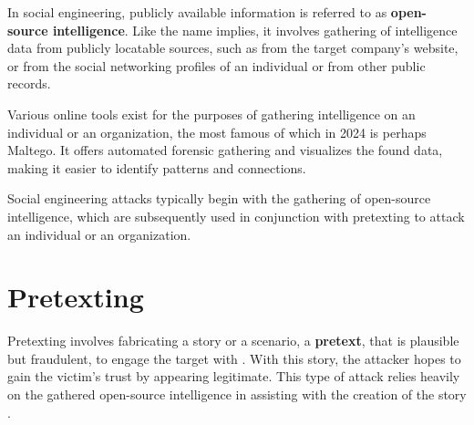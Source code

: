 In social engineering, publicly available information is referred to as \textbf{open-source intelligence}. Like the name implies, it involves gathering of intelligence data from publicly locatable sources, such as from the target company's website, or from the social networking profiles of an individual or from other public records.

Various online tools exist for the purposes of gathering intelligence on an individual or an organization, the most famous of which in 2024 is perhaps Maltego. It offers automated forensic gathering and visualizes the found data, making it easier to identify patterns and connections.

Social engineering attacks typically begin with the gathering of open-source intelligence, which are subsequently used in conjunction with pretexting to attack an individual or an organization.











\section{Pretexting}
\begin{comment}

    - General info about what is pretexting
    - Fabricated scenario that is plausible but fraudulent
    - Originally used by FBI
    - Impersonation
    - Discussion about how modern AI can aid with pretexting is in the final chapter
    - Role in the deception-based SE attacks
    - Common pretexting tactics will be covered later
    - How AI powers up pretexting will be discussed later
        - How AI tech can be utilized to create more sophisticated and convincing pretexts
        - Examples of successful pretexting attacks and their impacts
        - AI and automated pretexting attacks and their effectiveness
        - Analysis of pretexting evolving landscape with AI
    - Ethical considerations?
    - Countermeasures will be covered later also
        - How to identify and mitigate attempts
        - Recommendations for organiations to enhance their defenses against pretexting attacks
        
\end{comment}

Pretexting involves fabricating a story or a scenario, a \textbf{pretext}, that is plausible but fraudulent, to engage the target  with \citep{contehCybersecurityRisksVulnerabilities2016, fakhouriAIDrivenSolutionsForSocialEngineeringAttacks2024}. With this story, the attacker hopes to gain the victim's trust by appearing legitimate. This type of attack relies heavily on the gathered open-source intelligence in assisting with the creation of the story \citep{hadnagySocialEngineering2018}.

